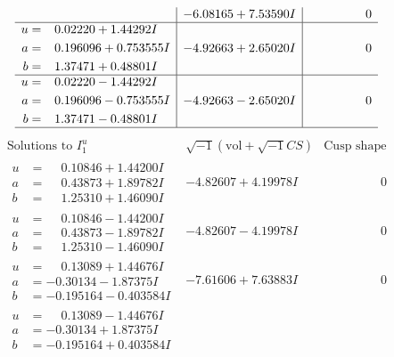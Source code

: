 \documentclass[1p]{elsarticle_modified}
\theoremstyle{definition}
\newcommand{\I}{\sqrt{-1}}
\begin{document}
$$\begin{array}{c|c|c}
 & -6.08165 + 7.53590 I & \phantom{-0.000000 } 0 \\ \hline\begin{aligned}
u &= \phantom{-}0.02220 + 1.44292 I \\
a &= \phantom{-}0.196096 + 0.753555 I \\
b &= \phantom{-}1.37471 + 0.48801 I\end{aligned}
 & -4.92663 + 2.65020 I & \phantom{-0.000000 } 0 \\ \hline\begin{aligned}
u &= \phantom{-}0.02220 - 1.44292 I \\
a &= \phantom{-}0.196096 - 0.753555 I \\
b &= \phantom{-}1.37471 - 0.48801 I\end{aligned}
 & -4.92663 - 2.65020 I & \phantom{-0.000000 } 0\\
 \hline 
 \end{array}$$\newpage$$\begin{array}{c|c|c}  
\text{Solutions to }I^u_{1}& \I (\text{vol} + \sqrt{-1}CS) & \text{Cusp shape}\\
 \hline 
\begin{aligned}
u &= \phantom{-}0.10846 + 1.44200 I \\
a &= \phantom{-}0.43873 + 1.89782 I \\
b &= \phantom{-}1.25310 + 1.46090 I\end{aligned}
 & -4.82607 + 4.19978 I & \phantom{-0.000000 } 0 \\ \hline\begin{aligned}
u &= \phantom{-}0.10846 - 1.44200 I \\
a &= \phantom{-}0.43873 - 1.89782 I \\
b &= \phantom{-}1.25310 - 1.46090 I\end{aligned}
 & -4.82607 - 4.19978 I & \phantom{-0.000000 } 0 \\ \hline\begin{aligned}
u &= \phantom{-}0.13089 + 1.44676 I \\
a &= -0.30134 - 1.87375 I \\
b &= -0.195164 - 0.403584 I\end{aligned}
 & -7.61606 + 7.63883 I & \phantom{-0.000000 } 0 \\ \hline\begin{aligned}
u &= \phantom{-}0.13089 - 1.44676 I \\
a &= -0.30134 + 1.87375 I \\
b &= -0.195164 + 0.403584 I\end{aligned}

\end{array}$$
\end{document}
